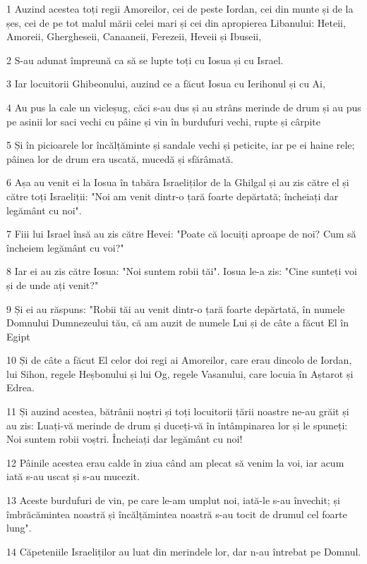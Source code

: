 \par 1 Auzind acestea toți regii Amoreilor, cei de peste Iordan, cei din munte și de la șes, cei de pe tot malul mării celei mari și cei din apropierea Libanului: Heteii, Amoreii, Ghergheseii, Canaaneii, Ferezeii, Heveii și Ibuseii,
\par 2 S-au adunat împreună ca să se lupte toți cu Iosua și cu Israel.
\par 3 Iar locuitorii Ghibeonului, auzind ce a făcut Iosua cu Ierihonul și cu Ai,
\par 4 Au pus la cale un vicleșug, căci s-au dus și au strâns merinde de drum și au pus pe asinii lor saci vechi cu pâine și vin în burdufuri vechi, rupte și cârpite
\par 5 Și în picioarele lor încălțăminte și sandale vechi și peticite, iar pe ei haine rele; pâinea lor de drum era uscată, mucedă și sfărâmată.
\par 6 Așa au venit ei la Iosua în tabăra Israeliților de la Ghilgal și au zis către el și către toți Israeliții: "Noi am venit dintr-o țară foarte depărtată; încheiați dar legământ cu noi".
\par 7 Fiii lui Israel însă au zis către Hevei: "Poate că locuiți aproape de noi? Cum să încheiem legământ cu voi?"
\par 8 Iar ei au zis către Iosua: "Noi suntem robii tăi". Iosua le-a zis: "Cine sunteți voi și de unde ați venit?"
\par 9 Și ei au răspuns: "Robii tăi au venit dintr-o țară foarte depărtată, în numele Domnului Dumnezeului tău, că am auzit de numele Lui și de câte a făcut El în Egipt
\par 10 Și de câte a făcut El celor doi regi ai Amoreilor, care erau dincolo de Iordan, lui Sihon, regele Heșbonului și lui Og, regele Vasanului, care locuia în Aștarot și Edrea.
\par 11 Și auzind acestea, bătrânii noștri și toți locuitorii țării noastre ne-au grăit și au zis: Luați-vă merinde de drum și duceți-vă în întâmpinarea lor și le spuneți: Noi suntem robii voștri. Încheiați dar legământ cu noi!
\par 12 Pâinile acestea erau calde în ziua când am plecat să venim la voi, iar acum iată s-au uscat și s-au mucezit.
\par 13 Aceste burdufuri de vin, pe care le-am umplut noi, iată-le s-au învechit; și îmbrăcămintea noastră și încălțămintea noastră s-au tocit de drumul cel foarte lung".
\par 14 Căpeteniile Israeliților au luat din merindele lor, dar n-au întrebat pe Domnul.
